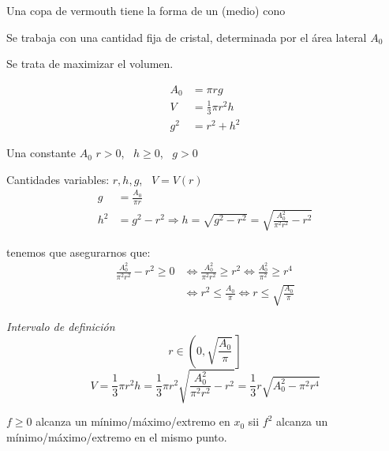 \documentclass[11pt,a4paper]{article}
\begin{document}
\begin{ejemplo}
  Una copa de vermouth tiene la forma de un (medio) cono

  Se trabaja con una cantidad fija de cristal, determinada por el área
  lateral $A_0$

  Se trata de maximizar el volumen.

  \begin{minipage}[c]{0.55\textwidth}
    \begin{align*}
      A_0&=\pi r g\\
      V&=\frac13\pi r^2 h\\
      g^2&=r^2+h^2
    \end{align*}
  \end{minipage}%
  \begin{minipage}[c]{0.4\textwidth}
    \centering
  \end{minipage}

  Una constante $A_0$ \qquad $r>0$, \ $h\geq 0$, \ $g>0$

  Cantidades variables: $r,h,g$, \ $V=V(r)$
  \begin{align*}
    g&=\frac{A_0}{\pi r}\\
    h^2&=g^2-r^2\Rightarrow h=\sqrt{g^2-r^2}
      =\sqrt{\frac{A_0^2}{\pi^2r^2}-r^2}
  \end{align*}

  tenemos que asegurarnos que:
  \begin{align*}
    \frac{A_0^2}{\pi^2r^2}-r^2\geq 0
    &\iff\frac{A_0^2}{\pi^2r^2}\geq r^2
     \iff\frac{A_0^2}{\pi^2}\geq r^4\\
    &\iff r^2\leq\frac{A_0}{\pi}\iff r\leq\sqrt{\frac{A_0}{\pi}}
  \end{align*}

  \textit{Intervalo de definición}
  \[
    r\in\left(0,\sqrt{\frac{A_0}{\pi}}\,\right]
  \]
  \[
    V=\frac13\pi r^2h=\frac13\pi r^2\sqrt{\frac{A_0^2}{\pi^2r^2}-r^2}
    =\frac13 r\sqrt{A_0^2-\pi^2r^4}
  \]

  \begin{lema}
    $f\geq 0$ alcanza un mínimo/\allowbreak máximo/\allowbreak extremo en
    $x_0$ sii $f^2$ alcanza un mínimo/\allowbreak máximo/\allowbreak extremo
    en el mismo punto.
  \end{lema}


\end{ejemplo}
\end{document}
